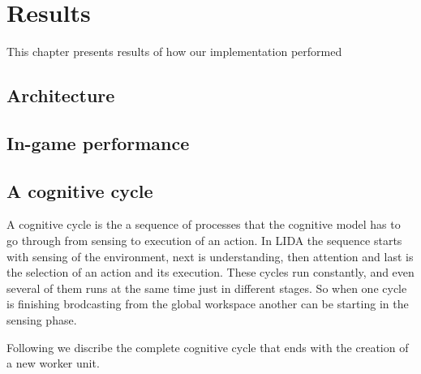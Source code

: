 
\chapter{Results}
This chapter presents results of how our implementation performed
\section{Architecture}
\label{sec:architecture}

\section{In-game performance}

\section{A cognitive cycle}
A cognitive cycle is the a sequence of processes that the cognitive model has to go through from sensing to execution of an action. In LIDA the sequence starts with sensing of the environment, next is understanding, then attention and last is the selection of an action and its execution. These cycles run constantly, and even several of them runs at the same time just in different stages. So when one cycle is finishing brodcasting from the global workspace another can be starting in the sensing phase. 

Following we discribe the complete cognitive cycle that ends with the creation of a new worker unit. 	

